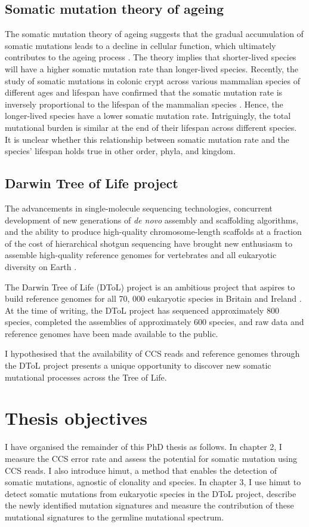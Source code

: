 \subsection{Somatic mutation theory of ageing}

The somatic mutation theory of ageing suggests that the gradual accumulation of somatic mutations leads to a decline in cellular function, which ultimately contributes to the ageing process \cite{Szilard1959-ru}. The theory implies that shorter-lived species will have a higher somatic mutation rate than longer-lived species. Recently, the study of somatic mutations in colonic crypt across various mammalian species of different ages and lifespan have confirmed that the somatic mutation rate is inversely proportional to the lifespan of the mammalian species \cite{Cagan2022-yn}. Hence, the longer-lived species have a lower somatic mutation rate. Intriguingly, the total mutational burden is similar at the end of their lifespan across different species. It is unclear whether this relationship between somatic mutation rate and the species’ lifespan holds true in other order, phyla, and kingdom.

\subsection{Darwin Tree of Life project}

The advancements in single-molecule sequencing technologies, concurrent development of new generations of \textit{de novo} assembly and scaffolding algorithms, and the ability to produce high-quality chromosome-length scaffolds at a fraction of the cost of hierarchical shotgun sequencing have brought new enthusiasm to assemble high-quality reference genomes for vertebrates \cite{Rhie2021-dq} and all eukaryotic diversity on Earth \cite{Lewin2018-zf}. 

The Darwin Tree of Life (DToL) project is an ambitious project that aspires to build reference genomes for all 70, 000 eukaryotic species in Britain and Ireland \cite{}. At the time of writing, the DToL project has sequenced approximately 800 species, completed the assemblies of approximately 600 species, and raw data and reference genomes have been made available to the public.

I hypothesised that the availability of CCS reads and reference genomes through the DToL project presents a unique opportunity to discover new somatic mutational processes across the Tree of Life. 

\section{Thesis objectives}

I have organised the remainder of this PhD thesis as follows. In chapter 2, I measure the CCS error rate and assess the potential for somatic mutation using CCS reads. I also introduce himut, a method that enables the detection of somatic mutations, agnostic of clonality and species. In chapter 3, I use himut to detect somatic mutations from eukaryotic species in the DToL project, describe the newly identified mutation signatures and measure the contribution of these mutational signatures to the germline mutational spectrum. 


